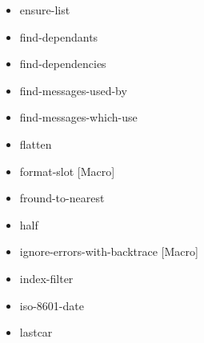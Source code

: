 \documentclass [11pt]{book}
\begin{document}
\begin{itemize}
\item {}ensure-list





\item {}find-dependants





\item {}find-dependencies





\item {}find-messages-used-by





\item {}find-messages-which-use





\item {}flatten





\item {}format-slot [Macro]





\item {}fround-to-nearest





\item {}half





\item {}ignore-errors-with-backtrace [Macro]





\item {}index-filter





\item {}iso-8601-date





\item {}lastcar






\end{itemize}
\end{document}
